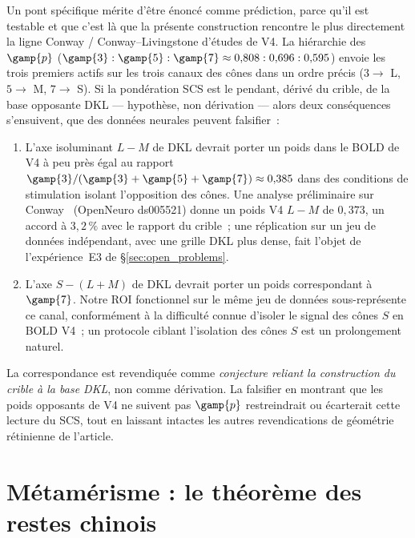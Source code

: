 \documentclass[12pt,a4paper]{article}
\begin{document}
Un pont sp\'ecifique m\'erite d'\^etre \'enonc\'e comme pr\'ediction,
parce qu'il est testable et que c'est l\`a que la pr\'esente
construction rencontre le plus directement la ligne Conway /
Conway--Livingstone d'\'etudes de V4. La hi\'erarchie des $\gamp{p}$
($\gamp{3} : \gamp{5} : \gamp{7} \approx 0{,}808 : 0{,}696 : 0{,}595$)
envoie les trois premiers actifs sur les trois canaux des c\^ones
dans un ordre pr\'ecis ($3 \to$ L, $5 \to$ M, $7 \to$ S). Si la
pond\'eration SCS est le pendant, d\'eriv\'e du crible, de la base
opposante DKL --- hypoth\`ese, non d\'erivation --- alors deux
cons\'equences s'ensuivent, que des donn\'ees neurales peuvent
falsifier~:

\begin{enumerate}[nosep]
\item L'axe isoluminant $L{-}M$ de DKL devrait porter un poids dans
  le BOLD de V4 \`a peu pr\`es \'egal au rapport
  $\gamp{3}/(\gamp{3}+\gamp{5}+\gamp{7}) \approx 0{,}385$ dans des
  conditions de stimulation isolant l'opposition des c\^ones. Une
  analyse pr\'eliminaire sur Conway~\cite{conway2025} (OpenNeuro ds005521) donne
  un poids V4 $L{-}M$ de $0{,}373$, un accord \`a $3{,}2\,\%$ avec le
  rapport du crible~; une r\'eplication sur un jeu de donn\'ees
  ind\'ependant, avec une grille DKL plus dense, fait l'objet de
  l'exp\'erience~E3 de \S\ref{sec:open_problems}.
\item L'axe $S{-}(L{+}M)$ de DKL devrait porter un poids correspondant
  \`a $\gamp{7}$. Notre ROI fonctionnel sur le m\^eme jeu de
  donn\'ees sous-repr\'esente ce canal, conform\'ement \`a la
  difficult\'e connue d'isoler le signal des c\^ones $S$ en BOLD V4~;
  un protocole ciblant l'isolation des c\^ones $S$ est un
  prolongement naturel.
\end{enumerate}

La correspondance est revendiqu\'ee comme \emph{conjecture reliant la
construction du crible \`a la base DKL}, non comme d\'erivation. La
falsifier en montrant que les poids opposants de V4 ne suivent pas
$\gamp{p}$ restreindrait ou \'ecarterait cette lecture du SCS, tout
en laissant intactes les autres revendications de g\'eom\'etrie
r\'etinienne de l'article.

\section{M\'etam\'erisme : le th\'eor\`eme des restes chinois}
\label{sec:metamerism}
\end{document}

